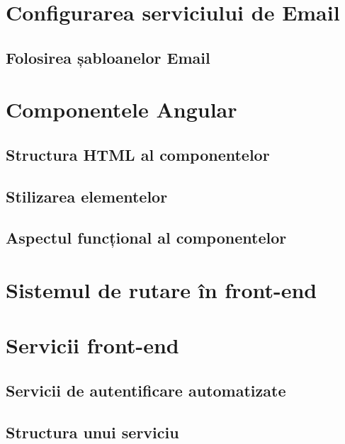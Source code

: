 \documentclass[12pt,a4paper]{report}
\theoremstyle{definition}
\theoremstyle{remark}
\begin{document}
\newpage

\section{Configurarea serviciului de Email}

\subsection{Folosirea șabloanelor Email}

\newpage

\section{Componentele Angular}

\subsection{Structura HTML al componentelor}

\subsection{Stilizarea elementelor}

\subsection{Aspectul funcțional al componentelor}

\newpage

\section{Sistemul de rutare în front-end}

\newpage

\section{Servicii front-end}

\subsection{Servicii de autentificare automatizate}

\subsection{Structura unui serviciu}
\end{document}
